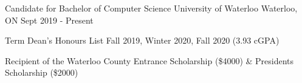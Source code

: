 
\begin{cventries}
  \cventry
    {Candidate for Bachelor of Computer Science} %
    {University of Waterloo} %
    {Waterloo, ON} %
    {Sept 2019 - Present} %
    {
      \begin{cvitems} %
         \item {Term Dean's Honours List Fall 2019, Winter 2020, Fall 2020 (3.93 cGPA)}
         \vspace{0.5mm}
         \item {Recipient of the Waterloo County Entrance Scholarship (\$4000) \& President\textquotesingle s Scholarship (\$2000)}
      \end{cvitems}
    }
\end{cventries}
